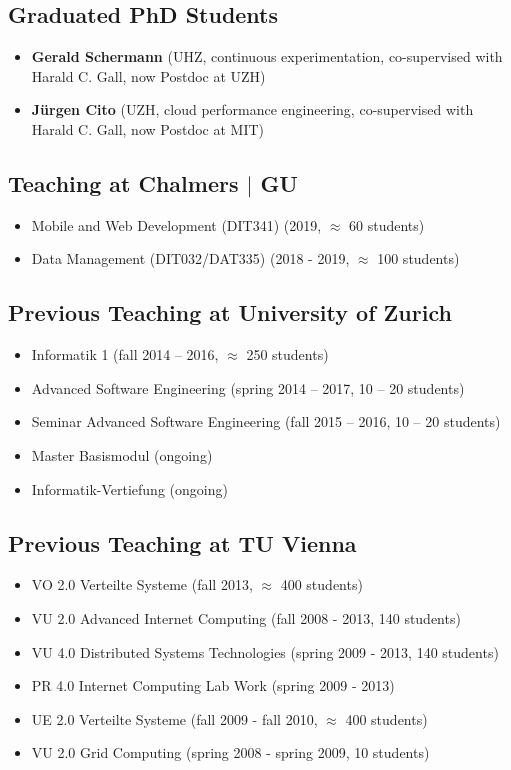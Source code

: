 \documentclass[paper=letter,fontsize=11pt]{scrartcl} %
\begin{document}
\subsection*{Graduated PhD Students}

\begin{itemize}
	\item \textbf{Gerald Schermann} (UHZ, continuous experimentation, co-supervised with Harald C. Gall, now Postdoc at UZH)
\item \textbf{J\"urgen Cito} (UZH, cloud performance engineering, co-supervised with Harald C. Gall, now Postdoc at MIT)
\end{itemize}

\subsection*{Teaching at Chalmers $|$ GU}
\begin{itemize}
	\item Mobile and Web Development (DIT341) (2019, $\approx$ 60 students)
  \item Data Management (DIT032/DAT335) (2018 - 2019, $\approx$ 100 students)
\end{itemize}

\subsection*{Previous Teaching at University of Zurich}
\begin{itemize}
  \item Informatik 1 (fall 2014 -- 2016, $\approx$ 250 students)
  \item Advanced Software Engineering (spring 2014 -- 2017, 10 -- 20 students)
  \item Seminar Advanced Software Engineering (fall 2015 -- 2016, 10 -- 20 students)
  \item Master Basismodul (ongoing)
  \item Informatik-Vertiefung (ongoing)
\end{itemize}

\subsection*{Previous Teaching at TU Vienna}
\begin{itemize}
  \item VO 2.0 Verteilte Systeme (fall 2013, $\approx$ 400  students)
  \item VU 2.0 Advanced Internet Computing (fall 2008 - 2013, 140 students)
  \item VU 4.0 Distributed Systems Technologies (spring 2009 - 2013, 140 students)
  \item PR 4.0 Internet Computing Lab Work (spring 2009 - 2013)
  \item UE 2.0 Verteilte Systeme (fall 2009 - fall 2010, $\approx$ 400 students)
  \item VU 2.0 Grid Computing (spring 2008 - spring 2009, 10 students)
\end{itemize}
\end{document}
